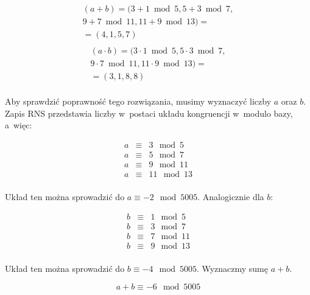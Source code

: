 \documentclass[a4paper,10pt, twocolumn]{article}
\begin{document}
\begin{equation*}
	\begin{array}{c}(a + b) = (3 + 1 \bmod{5}, 5 + 3 \bmod{7}, \\ 9 + 7 \bmod{11}, 11 + 9 \bmod{13}) = \\ =  (4, 1, 5, 7) \\ \end{array}
\end{equation*}
\begin{equation*}
	\begin{array}{c}(a \cdot b) = (3 \cdot 1 \bmod{5}, 5 \cdot 3 \bmod{7}, \\ 9 \cdot 7 \bmod{11}, 11 \cdot 9 \bmod{13}) = \\ =  (3, 1, 8, 8) \\ \end{array}
\end{equation*}

\noindent Aby sprawdzić poprawność tego rozwiązania, musimy wyznaczyć liczby $a$ oraz $b$. Zapis RNS przedstawia liczby w~postaci układu kongruencji w~modulo bazy, a~więc:

\begin{equation*}
	\begin{array}{lcl}a & \equiv & 3 \mod 5 \\ a & \equiv & 5 \mod 7 \\ a & \equiv & 9 \mod 11 \\ a & \equiv & 11 \mod 13 \\ \end{array}
\end{equation*}

\noindent Układ ten można sprowadzić do $a \equiv -2 \mod 5005$. Analogicznie dla $b$:

\begin{equation*}
	\begin{array}{lcl}b & \equiv & 1 \mod 5 \\ b & \equiv & 3 \mod 7 \\ b & \equiv & 7 \mod 11 \\ b & \equiv & 9 \mod 13 \\ \end{array}
\end{equation*}

\noindent Układ ten można sprowadzić do $b \equiv -4 \mod 5005$. Wyznaczmy sumę $a + b$.

\begin{equation*}
	a + b \equiv -6 \mod 5005
\end{equation*}
\end{document}
